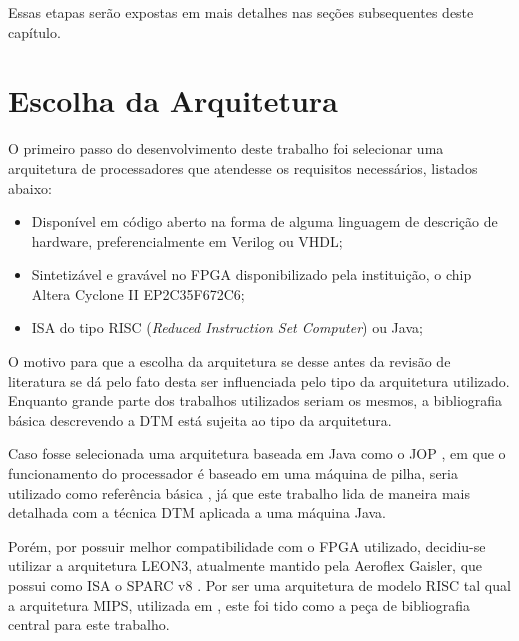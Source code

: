 Essas etapas serão expostas em mais detalhes nas seções subsequentes deste capítulo.

\section{Escolha da Arquitetura} 
\label{Metodologia:Arquitetura}

O primeiro passo do desenvolvimento deste trabalho foi selecionar uma arquitetura de processadores que atendesse os requisitos necessários, listados abaixo:

\begin{itemize}
	
	\item Disponível em código aberto na forma de alguma linguagem de descrição de hardware, preferencialmente em Verilog ou VHDL;
	
	\item Sintetizável e gravável no FPGA disponibilizado pela instituição, o chip Altera Cyclone II EP2C35F672C6;
	
	\item ISA do tipo RISC (\textit{Reduced Instruction Set Computer}) ou Java;
	
	
\end{itemize}

O motivo para que a escolha da arquitetura se desse antes da revisão de literatura se dá pelo fato desta ser influenciada pelo tipo da arquitetura utilizado. Enquanto grande parte dos trabalhos utilizados seriam os mesmos, a bibliografia básica descrevendo a DTM está sujeita ao tipo da arquitetura.

Caso fosse selecionada uma arquitetura baseada em Java como o JOP \cite{schoeberl2005jop}, em que o funcionamento do processador é baseado em uma máquina de pilha, seria utilizado como referência básica \cite{silva2006memorizacao}, já que este trabalho lida de maneira mais detalhada com a técnica DTM aplicada a uma máquina Java.

Porém, por possuir melhor compatibilidade com o FPGA utilizado, decidiu-se utilizar a arquitetura LEON3, atualmente mantido pela Aeroflex Gaisler, que possui como ISA o SPARC v8 \cite{gaisler2010leon3}. Por ser uma arquitetura de modelo RISC tal qual a arquitetura MIPS, utilizada em \cite{costa2001explorando}, este foi tido como a peça de bibliografia central para este trabalho.


